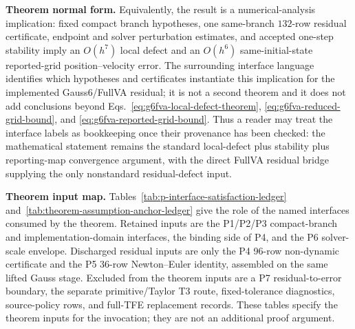 \documentclass[preprint,12pt]{elsarticle}
\newcommand{\method}{Gauss6\slash FullVA}
\newcommand{\tfe}{TFE}
\begin{document}
\noindent\textbf{Theorem normal form.}
Equivalently, the result is a numerical-analysis implication: fixed compact
branch hypotheses, one same-branch \(132\)-row residual certificate, endpoint
and solver perturbation estimates, and accepted one-step stability imply an
\(O(h^7)\) local defect and an \(O(h^6)\) same-initial-state reported-grid
position--velocity error.  The surrounding interface language identifies
which hypotheses and certificates instantiate this implication for the
implemented \method{} residual; it is not a second theorem and it does not
add conclusions beyond Eqs.~\eqref{eq:g6fva-local-defect-theorem},
\eqref{eq:g6fva-reduced-grid-bound}, and
\eqref{eq:g6fva-reported-grid-bound}.
Thus a reader may treat the interface labels as bookkeeping once their
provenance has been checked: the
mathematical statement remains the standard local-defect plus stability plus
reporting-map convergence argument, with the direct FullVA residual bridge
supplying the only nonstandard residual-defect input.

\noindent\textbf{Theorem input map.}
Tables~\ref{tab:p-interface-satisfaction-ledger}
and~\ref{tab:theorem-assumption-anchor-ledger} give the role of the named
interfaces consumed by the theorem.  Retained inputs are the P1/P2/P3
compact-branch and implementation-domain interfaces, the binding side of P4,
and the P6 solver-scale envelope.  Discharged residual inputs are only the
P4 96-row non-dynamic certificate and the P5 36-row Newton--Euler identity,
assembled on the same lifted Gauss stage.  Excluded from the theorem inputs
are a P7 residual-to-error boundary, the separate primitive/Taylor T3 route,
fixed-tolerance diagnostics, source-policy rows, and full-\tfe{} replacement
records.  These tables specify the theorem inputs for the invocation; they
are not an additional proof argument.
\end{document}
